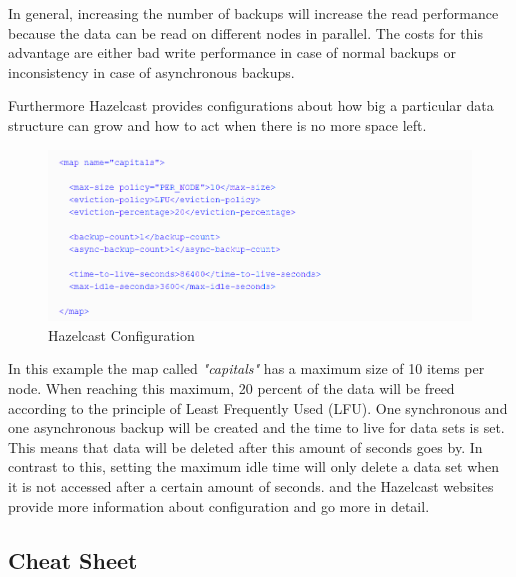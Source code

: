 In general, increasing the number of backups will increase the read performance because the data can be read on different nodes in parallel. The costs for this advantage are either bad write performance in case of normal backups or inconsistency in case of asynchronous backups.

Furthermore Hazelcast provides configurations about how big a particular data structure can grow and how to act when there is no more space left. 
\begin{flushleft}
\begin{figure}[h]
    \includegraphics{img/hazelcastXML.PNG}
    \caption{Hazelcast Configuration \parencite{johns2015}}
\end{figure}
\end{flushleft}
In this example the map called \textit{"capitals"} has a maximum size of 10 items per node. When reaching this maximum, 20 percent of the data will be freed according to the principle of Least Frequently Used (LFU). One synchronous and one asynchronous backup will be created and the time to live for data sets is set. This means that data will be deleted after this amount of seconds goes by. In contrast to this, setting the maximum idle time will only delete a data set when it is not accessed after a certain amount of seconds.
\citeauthor{johns2015} and the Hazelcast websites provide more information about configuration and go more in detail.

\subsection{Cheat Sheet}
